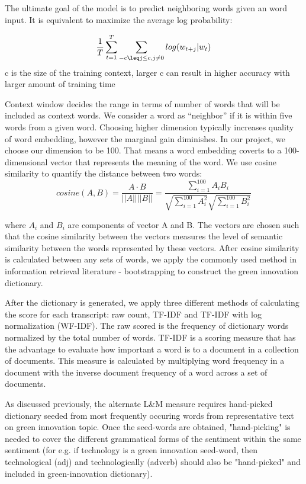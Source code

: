 \documentclass[10pt]{article}
\begin{document}
The ultimate goal of the model is to predict neighboring words given an word input. It is equivalent to maximize the average log probability: 

\[\frac{1}{T}\sum^{T}_{t=1}\sum_{-c\leqj\leq c,j\not=0} log(w_{t+j}|w_{t})\]
c is the size of the training context, larger c can result in higher accuracy with larger amount of training time

Context window decides the range in terms of number of words that will be included as context words. We consider a word as “neighbor” if it is within five words from a given word. 
Choosing higher dimension typically increases quality of word embedding, however the marginal gain diminishes. In our project, we choose our dimension to be 100. That means a word embedding coverts to a 100-dimensional vector that represents the meaning of the word. We use cosine similarity to quantify the distance between two words:
\[cosine(A,B) = \frac{A\cdot B}{||A||||B||}=\frac{
\sum^{100}_{i=1}A_{i}B_{i}}{\sqrt{\sum^{100}_{i=1}A_{i}^{2}}\sqrt{\sum^{100}_{i=1}B_{i}^{2}}}\]

where $A_{i}$ and $B_{i}$ are components of vector A and B. 
The vectors are chosen such that the cosine similarity between the vectors measures the level of semantic similarity between the words represented by these vectors. After cosine similarity is calculated between any sets of words, we apply the commonly used method in information retrieval literature - bootstrapping to construct the green innovation dictionary. 


After the dictionary is generated, we apply three different methods of calculating the score for each transcript: raw count, TF-IDF and TF-IDF with log normalization (WF-IDF). The raw scored is the frequency of dictionary words normalized by the total number of words. TF-IDF is a scoring measure that has the advantage to evaluate how important a word is to a document in a collection of documents. This measure is calculated by multiplying word frequency in a document with the inverse document frequency of a word across a set of documents. 

As discussed previously, the alternate L\&M measure requires hand-picked dictionary seeded from most frequently occuring words from representative text on green innovation topic. Once the seed-words are obtained, "hand-picking" is needed to cover the different grammatical forms of the sentiment within the same sentiment (for e.g. if technology is a green innovation seed-word, then technological (adj) and technologically (adverb) should also be "hand-picked" and included in green-innovation dictionary).
\end{document}
